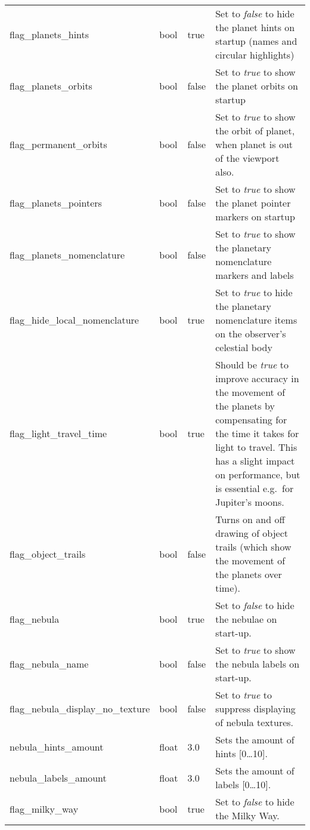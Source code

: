 \begin{longtable}{l|l|l|p{55mm}}
flag\_planets\_hints               & bool   & true  & Set to \emph{false} to hide the planet hints on startup (names and circular highlights)\\%
flag\_planets\_orbits              & bool   & false & Set to \emph{true} to show the planet orbits on startup\\%
flag\_permanent\_orbits            & bool   & false & Set to \emph{true} to show the orbit of planet, when planet is out of the viewport also.\\%
flag\_planets\_pointers            & bool   & false & Set to \emph{true} to show the planet pointer markers on startup\\%
flag\_planets\_nomenclature        & bool   & false & Set to \emph{true} to show the planetary nomenclature markers and labels\\%
flag\_hide\_local\_nomenclature    & bool   & true & Set to \emph{true} to hide the planetary nomenclature items on the observer's celestial body\\\midrule
%
flag\_light\_travel\_time          & bool   & true  & Should be \emph{true} to improve accuracy in the movement of the planets by compensating 
                                           for the time it takes for light to travel. This has a slight impact on performance, 
                                           but is essential e.g.\ for Jupiter's moons.\\%
flag\_object\_trails               & bool   & false & Turns on and off drawing of object trails (which show the movement of the planets over time).\\%
%
flag\_nebula                       & bool   & true  & Set to \emph{false} to hide the nebulae on start-up. \\%
flag\_nebula\_name                 & bool   & false & Set to \emph{true} to show the nebula labels on start-up. \\%
flag\_nebula\_display\_no\_texture & bool   & false & Set to \emph{true} to suppress displaying of nebula textures. \\%
nebula\_hints\_amount              & float  & 3.0   & Sets the amount of hints [0\ldots10]. \\%
nebula\_labels\_amount             & float  & 3.0   & Sets the amount of labels [0\ldots10].\\%
flag\_milky\_way                   & bool   & true  & Set to \emph{false} to hide the Milky Way.\\%

\end{longtable}
